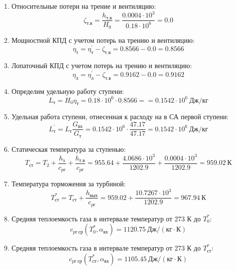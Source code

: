 \documentclass[a4paper,12pt]{article}
\begin{document}
\begin{enumerate}
        \item Относительные потери на трение и вентиляцию:
        \[
            \zeta_{т.в} = \frac{ h_{т.в} }{ H_0 } =
                \frac{ 0.0004 \cdot 10^3 }{ 0.18 \cdot 10^6 } =
            0.0
        \]

        \item Мощностной КПД с учетом потерь на трению и вентиляцию:
        \[
            \eta_т = \eta_т^\prime - \zeta_{т.в} =
                0.8566 - 0.0 =
            0.8566
        \]

        \item Лопаточный КПД с учетом потерь на трению и вентиляцию:
        \[
            \eta_л = \eta_л^\prime - \zeta_{т.в} =
                0.9162 - 0.0 =
            0.9162
        \]

        \item Определим удельную работу ступени:
        \[
            L_т = H_0 \eta_т = 0.18 \cdot 10^6 \cdot 0.8566 =
            = 0.1542 \cdot 10^6 \ Дж/кг
        \]

        \item Удельная работа ступени, отнесенная к расходу на в СА первой ступени:
        \[
            L_т^\prime = L_т \frac{ G_{вх} }{ G_т }  =
                0.1542 \cdot 10^6 \cdot
                \frac{ 47.17 }{ 47.17 } =
            0.1542 \cdot 10^6 \ Дж/кг
        \]

        \item Статическая температура за ступенью:
        \[
            T_{ст} = T_2 + \frac{ h_з }{ c_{pг} } + \frac{ h_{т.в} }{ c_{pг} } =
                955.64 +
                \frac{4.0686 \cdot 10^3 }{ 1202.9 } +
                \frac{ 0.0004 \cdot 10^3 }{ 1202.9 } =
            959.02 \ К
        \]

        \item Температура торможения за турбиной:
        \[
            T_{ст}^* = T_{ст} + \frac{ h_{вых} }{ c_{pг} } =
                959.02 +
                \frac{ 10.7267 \cdot 10^3 }{ 1202.9 } =
            967.94 \ К
        \]

        \item Средняя теплоемкость газа в интервале температур от 273 К до $T_0^*$:
        \[
            c_{pг\ ср} (T_0^*, \alpha_{вх}) =
            1120.75 \ Дж/(кг \cdot К)
        \]

        \item Средняя теплоемкость газа в интервале температур от 273 К до $T_{ст}^*$:
        \[
            c_{pг\ ср} (T_{ст}^*, \alpha_{вх}) =
            1105.45 \ Дж/(кг \cdot К)
        \]


\end{enumerate}
\end{document}
